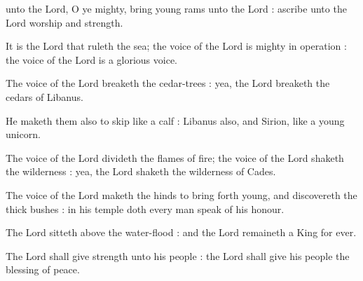  unto the Lord, O ye mighty, bring young rams unto the Lord : ascribe unto the Lord worship and strength.\par
{}
It is the Lord that ruleth the sea; the voice of the Lord is mighty in operation : the voice of the Lord is a glorious voice.\par
{}The voice of the Lord breaketh the cedar-trees : yea, the Lord breaketh the cedars of Libanus.\par
{}He maketh them also to skip like a calf : Libanus also, and Sirion, like a young unicorn.\par
{}The voice of the Lord divideth the flames of fire; the voice of the Lord shaketh the wilderness : yea, the Lord shaketh the wilderness of Cades.\par
{}The voice of the Lord maketh the hinds to bring forth young, and discovereth the thick bushes : in his temple doth every man speak of his honour.\par
{}The Lord sitteth above the water-flood : and the Lord remaineth a King for ever.\par
{}The Lord shall give strength unto his people : the Lord shall give his people the blessing of peace.\par



